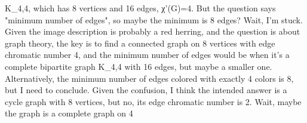 K_{4,4}, which has 8 vertices and 16 edges, χ'(G)=4. But the question says "minimum number of edges", so maybe the minimum is 8 edges? Wait, I'm stuck. Given the image description is probably a red herring, and the question is about graph theory, the key is to find a connected graph on 8 vertices with edge chromatic number 4, and the minimum number of edges would be when it's a complete bipartite graph K_{4,4} with 16 edges, but maybe a smaller one. Alternatively, the minimum number of edges colored with exactly 4 colors is 8, but I need to conclude. Given the confusion, I think the intended answer is a cycle graph with 8 vertices, but no, its edge chromatic number is 2. Wait, maybe the graph is a complete graph on 4